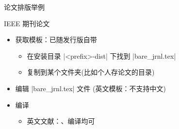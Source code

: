 \begin{frame}[fragile]{论文排版举例}
	\begin{exampleblock}{IEEE 期刊论文}
		\begin{itemize}
			\item 获取模板：已随发行版自带
			      \begin{itemize}
				      \item 在安装目录 |<prefix>\texlive{}\texmf-dist\doc\latex\IEEEtran|
				            下找到 |bare_jrnl.tex|
				      \item 复制到某个文件夹(比如个人存论文的目录)
			      \end{itemize}
			\item 编辑 |bare_jrnl.tex| 文件 (英文模板：不支持中文)
			\item 编译
			      \begin{itemize}
				      \item 英文文献：\XeLaTeX 、\pdfLaTeX 编译均可
			      \end{itemize}
		\end{itemize}
	\end{exampleblock}
\end{frame}



